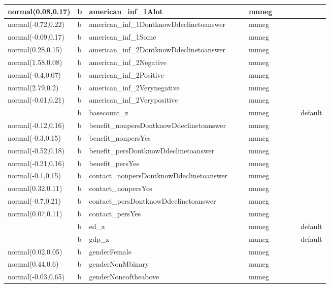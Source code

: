 \documentclass[
]{book}
\theoremstyle{definition}
\theoremstyle{definition}
\theoremstyle{definition}
\theoremstyle{definition}
\theoremstyle{remark}
\begin{document}
\begin{table}
\begin{tabular}[t]{l|l|l|l|l|l|l|l|l|l}
normal(0.08,0.17) & b & american\_inf\_1Alot &  &  & muneg &  &  &  & \\
\hline
normal(-0.72,0.22) & b & american\_inf\_1DontknowDdeclinetoanswer &  &  & muneg &  &  &  & \\
\hline
normal(-0.09,0.17) & b & american\_inf\_1Some &  &  & muneg &  &  &  & \\
\hline
normal(0.28,0.15) & b & american\_inf\_2DontknowDdeclinetoanswer &  &  & muneg &  &  &  & \\
\hline
normal(1.58,0.08) & b & american\_inf\_2Negative &  &  & muneg &  &  &  & \\
\hline
normal(-0.4,0.07) & b & american\_inf\_2Positive &  &  & muneg &  &  &  & \\
\hline
normal(2.79,0.2) & b & american\_inf\_2Verynegative &  &  & muneg &  &  &  & \\
\hline
normal(-0.61,0.21) & b & american\_inf\_2Verypositive &  &  & muneg &  &  &  & \\
\hline
 & b & basecount\_z &  &  & muneg &  &  &  & default\\
\hline
normal(-0.12,0.16) & b & benefit\_nonpersDontknowDdeclinetoanswer &  &  & muneg &  &  &  & \\
\hline
normal(-0.3,0.15) & b & benefit\_nonpersYes &  &  & muneg &  &  &  & \\
\hline
normal(-0.52,0.18) & b & benefit\_persDontknowDdeclinetoanswer &  &  & muneg &  &  &  & \\
\hline
normal(-0.21,0.16) & b & benefit\_persYes &  &  & muneg &  &  &  & \\
\hline
normal(-0.1,0.15) & b & contact\_nonpersDontknowDdeclinetoanswer &  &  & muneg &  &  &  & \\
\hline
normal(0.32,0.11) & b & contact\_nonpersYes &  &  & muneg &  &  &  & \\
\hline
normal(-0.7,0.21) & b & contact\_persDontknowDdeclinetoanswer &  &  & muneg &  &  &  & \\
\hline
normal(0.07,0.11) & b & contact\_persYes &  &  & muneg &  &  &  & \\
\hline
 & b & ed\_z &  &  & muneg &  &  &  & default\\
\hline
 & b & gdp\_z &  &  & muneg &  &  &  & default\\
\hline
normal(0.02,0.05) & b & genderFemale &  &  & muneg &  &  &  & \\
\hline
normal(0.44,0.6) & b & genderNonMbinary &  &  & muneg &  &  &  & \\
\hline
normal(-0.03,0.65) & b & genderNoneoftheabove &  &  & muneg &  &  &  & \\

\end{tabular}
\end{table}
\end{document}
